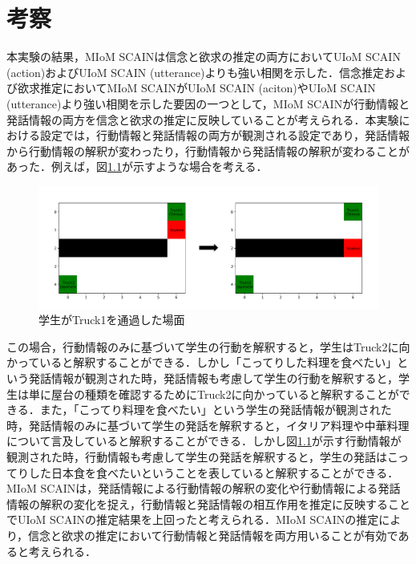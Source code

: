 \chapter{考察}
\par
本実験の結果，MIoM SCAINは信念と欲求の推定の両方においてUIoM SCAIN (action)およびUIoM SCAIN (utterance)よりも強い相関を示した．信念推定および欲求推定においてMIoM SCAINがUIoM SCAIN (aciton)やUIoM SCAIN (utterance)より強い相関を示した要因の一つとして，MIoM SCAINが行動情報と発話情報の両方を信念と欲求の推定に反映していることが考えられる．本実験における設定では，行動情報と発話情報の両方が観測される設定であり，発話情報から行動情報の解釈が変わったり，行動情報から発話情報の解釈が変わることがあった．例えば，図\ref{fig:ex_env2}が示すような場合を考える．
\begin{figure}[htbp]
  \begin{center}
    \includegraphics[scale=0.48]{./ex_env2.pdf}
    \caption{学生がTruck1を通過した場面}
    \label{fig:ex_env2}
  \end{center}
\end{figure}
この場合，行動情報のみに基づいて学生の行動を解釈すると，学生はTruck2に向かっていると解釈することができる．しかし「こってりした料理を食べたい」という発話情報が観測された時，発話情報も考慮して学生の行動を解釈すると，学生は単に屋台の種類を確認するためにTruck2に向かっていると解釈することができる．また，「こってり料理を食べたい」という学生の発話情報が観測された時，発話情報のみに基づいて学生の発話を解釈すると，イタリア料理や中華料理について言及していると解釈することができる．しかし図\ref{fig:ex_env2}が示す行動情報が観測された時，行動情報も考慮して学生の発話を解釈すると，学生の発話はこってりした日本食を食べたいということを表していると解釈することができる．
MIoM SCAINは，発話情報による行動情報の解釈の変化や行動情報による発話情報の解釈の変化を捉え，行動情報と発話情報の相互作用を推定に反映することでUIoM SCAINの推定結果を上回ったと考えられる．MIoM SCAINの推定により，信念と欲求の推定において行動情報と発話情報を両方用いることが有効であると考えられる．

